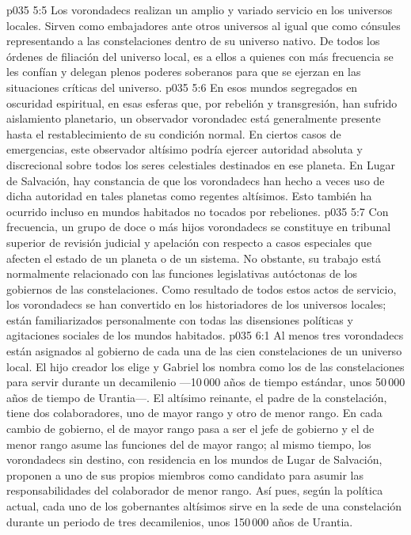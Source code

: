 \vs p035 5:5 Los vorondadecs realizan un amplio y variado servicio en los universos locales. Sirven como embajadores ante otros universos al igual que como cónsules representando a las constelaciones dentro de su universo nativo. De todos los órdenes de filiación del universo local, es a ellos a quienes con más frecuencia se les confían y delegan plenos poderes soberanos para que se ejerzan en las situaciones críticas del universo.
\vs p035 5:6 En esos mundos segregados en oscuridad espiritual, en esas esferas que, por rebelión y transgresión, han sufrido aislamiento planetario, un observador vorondadec está generalmente presente hasta el restablecimiento de su condición normal. En ciertos casos de emergencias, este observador altísimo podría ejercer autoridad absoluta y discrecional sobre todos los seres celestiales destinados en ese planeta. En Lugar de Salvación, hay constancia de que los vorondadecs han hecho a veces uso de dicha autoridad en tales planetas como regentes altísimos. Esto también ha ocurrido incluso en mundos habitados no tocados por rebeliones.
\vs p035 5:7 Con frecuencia, un grupo de doce o más hijos vorondadecs se constituye en tribunal superior de revisión judicial y apelación con respecto a casos especiales que afecten el estado de un planeta o de un sistema. No obstante, su trabajo está normalmente relacionado con las funciones legislativas autóctonas de los gobiernos de las constelaciones. Como resultado de todos estos actos de servicio, los vorondadecs se han convertido en los historiadores de los universos locales; están familiarizados personalmente con todas las disensiones políticas y agitaciones sociales de los mundos habitados.
\vs p035 6:1 Al menos tres vorondadecs están asignados al gobierno de cada una de las cien constelaciones de un universo local. El hijo creador los elige y Gabriel los nombra como los  de las constelaciones para servir durante un decamilenio ---10\,000 años de tiempo estándar, unos 50\,000 años de tiempo de Urantia---. El altísimo reinante, el padre de la constelación, tiene dos colaboradores, uno de mayor rango y otro de menor rango. En cada cambio de gobierno, el de mayor rango pasa a ser el jefe de gobierno y el de menor rango asume las funciones del de mayor rango; al mismo tiempo, los vorondadecs sin destino, con residencia en los mundos de Lugar de Salvación, proponen a uno de sus propios miembros como candidato para asumir las responsabilidades del colaborador de menor rango. Así pues, según la política actual, cada uno de los gobernantes altísimos sirve en la sede de una constelación durante un periodo de tres decamilenios, unos 150\,000 años de Urantia.
